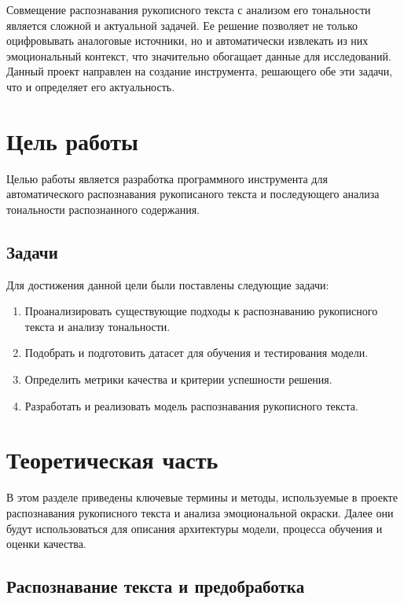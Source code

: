 \documentclass[12pt,a4paper]{article}
\begin{document}
Совмещение распознавания рукописного текста с анализом его тональности является сложной и актуальной задачей. Ее решение позволяет не только оцифровывать аналоговые источники, но и автоматически извлекать из них эмоциональный контекст, что значительно обогащает данные для исследований. Данный проект направлен на создание инструмента, решающего обе эти задачи, что и определяет его актуальность.

\section{Цель работы}
\label{sec:goal}

Целью работы является разработка программного инструмента для автоматического
распознавания рукописаного текста и последующего анализа тональности распознанного
содержания.

\subsection{Задачи}
Для достижения данной цели были поставлены следующие задачи:

\begin{enumerate}
    \item Проанализировать существующие подходы к распознаванию рукописного текста и анализу тональности.
    \item Подобрать и подготовить датасет для обучения и тестирования модели.
    \item Определить метрики качества и критерии успешности решения.
    \item Разработать и реализовать модель распознавания рукописного текста.
\end{enumerate}

\section{Теоретическая часть}
\label{sec:theory}

В этом разделе приведены ключевые термины и методы, используемые в проекте
распознавания рукописного текста и анализа эмоциональной окраски. Далее
они будут использоваться для описания архитектуры модели, процесса
обучения и оценки качества.

\subsection{Распознавание текста и предобработка}
\end{document}
